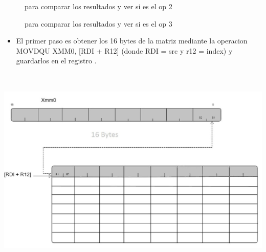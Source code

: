 \par      
\bigskip
 \begin{figure}[!ht]
  \centering
  \caption{para comparar los resultados y ver si es el op 2}
\end{figure}

\par      
\bigskip
 \begin{figure}[!ht]
  \centering
  \caption{para comparar los resultados y ver si es el op 3}
\end{figure}

\begin{itemize}
\item El primer paso es obtener los 16 bytes de la matriz mediante la operacion  MOVDQU XMM0, [RDI + R12] (donde RDI = src y r12 = index) y guardarlos en el registro .

\end{itemize}

\includegraphics[height=10cm]{levantar.jpg} 

